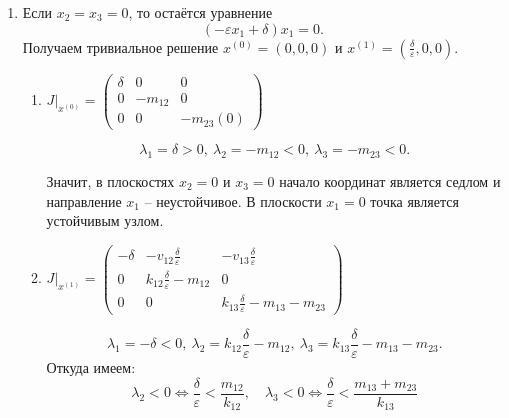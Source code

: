     \begin{enumerate}
        \item Если \( x_2 = x_3 = 0 \), то остаётся уравнение 
        \[ ( -\varepsilon x_1 + \delta ) x_1 = 0. \] 
        Получаем тривиальное решение \( x^{(0)} = (0,0,0) \) и \( x^{(1)} = \left(\frac{\delta}{\varepsilon}, 0, 0 \right) \).
        \begin{enumerate}
            \item \( J \big|_{x^{(0)}} = \left(
                \begin{matrix}
                    \delta & 0 & 0 \\
                    0 & -m_{12}  & 0 \\
                    0 & 0 & -m_{23} (0)
                \end{matrix}
            \right) \)

            \[
                \lambda_1 = \delta> 0, ~
                \lambda_2 = -m_{12} < 0, ~
                \lambda_3 = -m_{23} < 0.
            \]

            Значит, в плоскостях \( x_2 = 0 \) и \( x_3 = 0 \) начало координат является седлом и направление \( x_1 \) -- неустойчивое. В плоскости \( x_1 = 0 \) точка является устойчивым узлом.

            \item \( J \big|_{x^{(1)}} = \left(
                \begin{matrix}
                    -\delta & -v_{12} \frac{\delta}{\varepsilon} & -v_{13} \frac{\delta}{\varepsilon} \\
                    0 & k_{12} \frac{\delta}{\varepsilon} - m_{12} & 0 \\
                    0 & 0 & k_{13} \frac{\delta}{\varepsilon} -m_{13} - m_{23}
                \end{matrix}
            \right) \)

            \[
                \lambda_1 = -\delta < 0, ~
                \lambda_2 = k_{12} \frac{\delta}{\varepsilon} - m_{12}, ~
                \lambda_3 = k_{13} \frac{\delta}{\varepsilon} -m_{13} - m_{23}. 
            \]
            Откуда имеем:
            \[
                \lambda_2 < 0 \Leftrightarrow \frac{\delta}{\varepsilon} < \frac{m_{12}}{k_{12}},
                \quad
                \lambda_3 < 0 \Leftrightarrow \frac{\delta}{\varepsilon} < \frac{m_{13} + m_{23}}{k_{13}}
            \]


\end{enumerate}
\end{enumerate}
